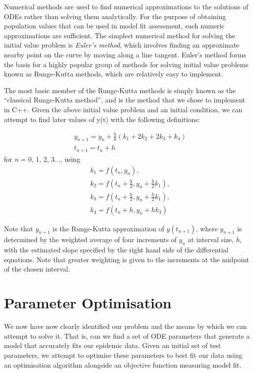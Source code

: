 \begin{framed}
Numerical methods are used to find numerical approximations to the
solutions of ODEs rather than solving them analytically. For the
purpose of obtaining population values that can be used in model fit
assessment, such numeric approximations are sufficient. The simplest
numerical method for solving the initial value problem is \emph
{Euler's method}, which involves finding an approximate nearby point
on the curve by moving along a line tangent. Euler's method forms
the basis for a highly popular group of
methods for solving initial value problems known as Runge-Kutta
methods, which are relatively easy to implement. 

The most basic member of the Runge-Kutta methods is simply known as
the ``classical Runge-Kutta method'', and is the method that we chose
to implement in C++. Given the above initial value problem and an
initial condition, we can attempt to find later values of y(t) with
the following definitions:

\begin{equation}
\begin{split}
  &y_{n+1} = y_n + \frac{h}{6}(k_1 + 2k_2 + 2k_3 + k_4)\\
  &t_{n+1} = t_n + h
 \end{split}
\end{equation}
for \emph{n} = 0, 1, 2, 3..., using
\begin{equation}
\begin{split}
  &k_1 = f(t_n,y_n),\\
  &k_2 = f(t_n + \frac{h}{2},y_n+ \frac{h}{2}k_1),\\
  &k_3 = f(t_n + \frac{h}{2},y_n+ \frac{h}{2}k_1),\\
  &k_4 = f(t_n+h,y_n+hk_3)
\end{split}
\end{equation}

Note that $y_{n+1}$ is the Runge-Kutta approximation of $y(t_{n+1})$,
where $y_{n+1}$ is determined by the weighted average of four
increments of $y_n$ at interval size, \emph{h}, with the estimated
slope specified by the right hand side of the differential
equations. Note that greater weighting is given to the increments at
the midpoint of the chosen interval.
\end{framed}

\section{Parameter Optimisation}
We now have now clearly identified our problem and the
means by which we can attempt to solve it. That is, can we find a set
of ODE parameters that generate a model that accurately fits our epidemic
data. Given an initial set of test parameters, we attempt to optimise
these parameters to best fit our data using an optimisation algorithm
alongside an objective function measuring model fit.

